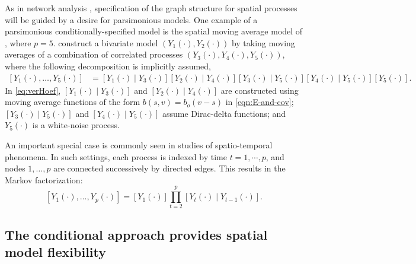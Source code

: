 \documentclass[lineno]{biometrika}
\newcommand{\red}{\textcolor{red}}%
\newcommand{\s}{s}
\newcommand{\h}{h}
\renewcommand{\v}{v}
\newcommand{\cov}{\mathrm{cov}}
\begin{document}
As in network analysis \citep[e.g.,][]{Kolaczyk_2009}, specification of the graph structure for spatial processes will be guided by a desire for parsimonious models. One example of a parsimonious conditionally-specified model  is the spatial moving average model of \cite{verHoef_1998}, where $p=5$. \cite{verHoef_1998} construct a bivariate model $(Y_1(\cdot),Y_2(\cdot))$ by taking moving averages of a combination of correlated processes $(Y_3(\cdot),Y_4(\cdot),Y_5(\cdot))$, where the following decomposition is implicitly assumed, 
\begin{align}\label{eq:verHoef}
[Y_1(\cdot),\dots,Y_5(\cdot)] &= [Y_1(\cdot) \mid  Y_3(\cdot)][Y_2(\cdot)\mid Y_4(\cdot)][Y_3(\cdot)\mid Y_5(\cdot)][Y_4(\cdot)\mid Y_5(\cdot)][Y_5(\cdot)].
\end{align}
\noindent In \eqref{eq:verHoef}, $[Y_1(\cdot) \mid  Y_3(\cdot)]$ and $[Y_2(\cdot) \mid  Y_4(\cdot)]$ are constructed using moving average functions of the form $b(\s,\v) = b_o(\v - \s)$ in \eqref{eqn:E-and-cov}; $[Y_3(\cdot)\mid Y_5(\cdot)]$ and $[Y_4(\cdot)\mid Y_5(\cdot)]$ assume Dirac-delta functions; and $Y_5(\cdot)$ is a white-noise process. 

An important special case is commonly seen in studies of spatio-temporal phenomena. In such settings, each process is indexed by time $t=1,\cdots,p$, and nodes $1,\dots,p$ are connected successively by directed edges. This results in the Markov factorization:
\begin{equation}\label{eq:Markov}
[Y_1(\cdot),\dots,Y_p(\cdot)]=[Y_1(\cdot)]\prod_{t=2}^p[Y_t(\cdot)\mid Y_{t-1}(\cdot)].
\end{equation}



\subsection{The conditional approach provides spatial model flexibility}
\end{document}
